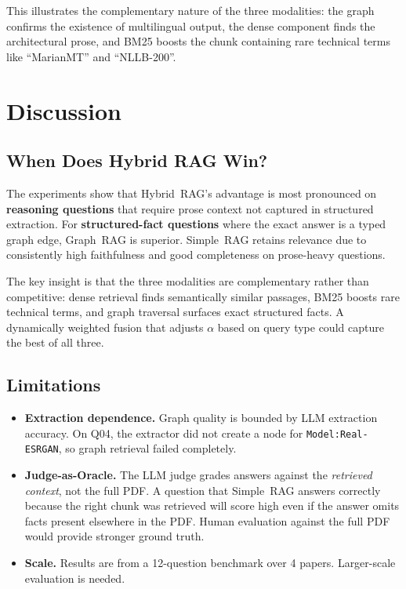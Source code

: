 \documentclass[conference]{IEEEtran}
\begin{document}
This illustrates the complementary nature of the three modalities: the
graph confirms the existence of multilingual output, the dense component
finds the architectural prose, and BM25 boosts the chunk containing rare
technical terms like ``MarianMT'' and ``NLLB-200''.

\section{Discussion}
\label{sec:discussion}

\subsection{When Does Hybrid RAG Win?}
The experiments show that Hybrid~RAG's advantage is most pronounced on
\textbf{reasoning questions} that require prose context not captured in
structured extraction. For \textbf{structured-fact questions} where the
exact answer is a typed graph edge, Graph~RAG is superior.
Simple~RAG retains relevance due to consistently high faithfulness and
good completeness on prose-heavy questions.

The key insight is that the three modalities are complementary rather
than competitive: dense retrieval finds semantically similar passages,
BM25 boosts rare technical terms, and graph traversal surfaces exact
structured facts. A dynamically weighted fusion that adjusts $\alpha$
based on query type could capture the best of all three.

\subsection{Limitations}
\begin{itemize}
  \item \textbf{Extraction dependence.} Graph quality is bounded by LLM
  extraction accuracy. On Q04, the extractor did not create a node for
  \texttt{Model:Real-ESRGAN}, so graph retrieval failed completely.
  \item \textbf{Judge-as-Oracle.} The LLM judge grades answers against
  the \emph{retrieved context}, not the full PDF. A question that
  Simple~RAG answers correctly because the right chunk was retrieved will
  score high even if the answer omits facts present elsewhere in the PDF.
  Human evaluation against the full PDF would provide stronger ground truth.
  \item \textbf{Scale.} Results are from a 12-question benchmark over 4
  papers. Larger-scale evaluation is needed.
\end{itemize}
\end{document}
